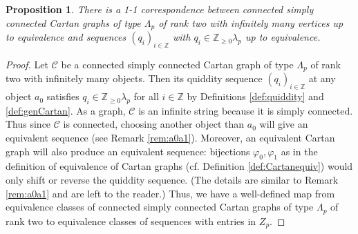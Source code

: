 \documentclass[11pt,a4paper]{amsart}
\newtheorem{Proposition}[Lemma]{Proposition}
\theoremstyle{definition}
\numberwithin{equation}{section}
\newcommand{\Cc }{\mathcal{C}}
\begin{document}
\begin{Proposition}\label{wg:quideq}
There is a 1-1 correspondence between connected simply connected Cartan graphs of type $\Lambda_p$ of rank two with infinitely many 
vertices up to equivalence and sequences $(q_i)_{i\in\mathbb{Z}}$ with
$q_i\in \mathbb{Z}_{\ge 0} \lambda_p$
up to equivalence.
\end{Proposition}

\begin{proof}
Let $\Cc$ be a connected simply connected Cartan graph of type $\Lambda_p$ 
of rank two with infinitely many objects. Then its quiddity sequence $(q_i)_{i\in\mathbb{Z}}$ at any object $a_0$ satisfies $q_i\in 
\mathbb{Z}_{\ge 0}\lambda_p$ for all $i\in\mathbb{Z}$ by Definitions \ref{def:quiddity}
and \ref{def:genCartan}.
As a graph, $\Cc$ is an infinite string because it is simply connected.
Thus since $\Cc$ is connected, choosing another object than $a_0$ will give an equivalent sequence
(see Remark \ref{rem:a0a1}). 
Moreover, an equivalent Cartan graph will also produce an equivalent sequence: bijections $\varphi_0,\varphi_1$ as in the definition of equivalence of Cartan graphs (cf. Definition \ref{def:Cartanequiv})
would only shift or reverse the quiddity sequence. 
(The details are similar to Remark \ref{rem:a0a1}
and are left to the reader.) Thus, we have a 
well-defined map from equivalence classes of
connected simply connected Cartan graphs of
type $\Lambda_p$ of rank two to equivalence 
classes of sequences with entries in $Z_p$. 


\end{proof}
\end{document}
